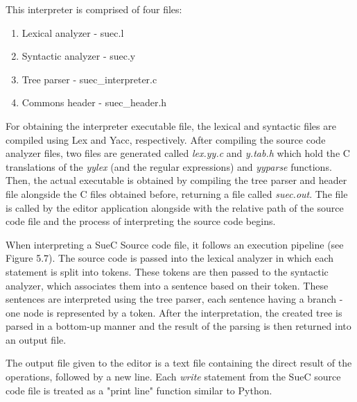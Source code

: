 \documentclass[12pt,a4paper,twoside]{report}
\begin{document}
This interpreter is comprised of four files:
\begin{enumerate}
\setlength{\parskip}{-1pt}
\setlength{\topsep}{-1pt}
\item Lexical analyzer - suec.l
\item Syntactic analyzer - suec.y
\item Tree parser - suec\_interpreter.c 
\item Commons header - suec\_header.h
\end{enumerate}

For obtaining the interpreter executable file, the lexical and syntactic files are compiled using Lex and Yacc, respectively. After compiling the source code analyzer files, two files are generated called \textit{lex.yy.c} and \textit{y.tab.h} which hold the C translations of the \textit{yylex} (and the regular expressions) and \textit{yyparse} functions. Then, the actual executable is obtained by compiling the tree parser and header file alongside the C files obtained before, returning a file called \textit{suec.out}. The file is called by the editor application alongside with the relative path of the source code file and the process of interpreting the source code begins. 

When interpreting a SueC Source code file, it follows an execution pipeline (see Figure 5.7). The source code is passed into the lexical analyzer in which each statement is split into tokens. These tokens are then passed to the syntactic analyzer, which associates them into a sentence based on their token. These sentences are interpreted using the tree parser, each sentence having a branch - one node is represented by a token. After the interpretation, the created tree is parsed in a bottom-up manner and the result of the parsing is then returned into an output file. 

The output file given to the editor is a text file containing the direct result of the operations, followed by a new line. Each \textit{write} statement from the SueC source code file is treated as a "print line" function similar to Python.  
\end{document}
